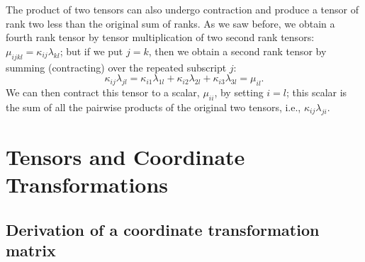 The product of two tensors can also undergo contraction and produce a tensor of rank two less than the original sum of ranks.  As we saw before, we obtain a fourth rank tensor by tensor multiplication of two second rank tensors: $\mu_{ijkl} =  \kappa_{ij}\lambda_{kl}$; but if we put $j=k$, then we obtain a second rank tensor by summing (contracting) over the repeated subscript $j$:
\[
	 \kappa_{ij}\lambda_{jl} =  \kappa_{i1}\lambda_{1l} + \kappa_{i2}\lambda_{2l} + \kappa_{i3}\lambda_{3l} = \mu_{il}. 
\]
We can then contract this tensor to a scalar, $\mu_{ii}$, by setting $i=l$; this scalar is the sum of all the pairwise products of the original two tensors, i.e., $\kappa_{ij}\lambda_{ji}$.



\section{Tensors and Coordinate Transformations}\label{\chabbr:sec:tensortrafo}

\subsection{Derivation of a coordinate transformation matrix}

